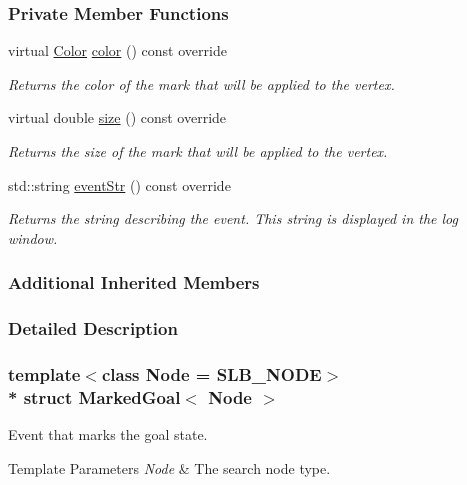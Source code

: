 \subsubsection*{Private Member Functions}
\begin{DoxyCompactItemize}
\item 
virtual \hyperlink{colors_8h_ab87bacfdad76e61b9412d7124be44c1c}{Color} \hyperlink{structMarkedGoal_abc0b74d264e91375b0d9f6f8f43e76e7}{color} () const override
\begin{DoxyCompactList}\small\item\em Returns the color of the mark that will be applied to the vertex. \end{DoxyCompactList}\item 
virtual double \hyperlink{structMarkedGoal_a44be9ee3801426e30d78bba6f54eafe9}{size} () const override
\begin{DoxyCompactList}\small\item\em Returns the size of the mark that will be applied to the vertex. \end{DoxyCompactList}\item 
std\+::string \hyperlink{structMarkedGoal_acc6af5f9648ac4b8ad9cca96443ebd86}{event\+Str} () const override
\begin{DoxyCompactList}\small\item\em Returns the string describing the event. This string is displayed in the log window. \end{DoxyCompactList}\end{DoxyCompactItemize}
\subsubsection*{Additional Inherited Members}


\subsubsection{Detailed Description}
\subsubsection*{template$<$class Node = S\+L\+B\+\_\+\+N\+O\+DE$>$\\*
struct Marked\+Goal$<$ Node $>$}

Event that marks the goal state. 


\begin{DoxyTemplParams}{Template Parameters}
{\em Node} & The search node type. \\
\hline
\end{DoxyTemplParams}


